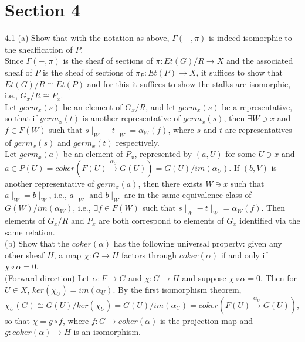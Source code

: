  \newpage
\section*{Section 4}
4.1 (a) Show that with the notation as above, $\Gamma(-, \pi)$ is indeed isomorphic to the sheaffication of $P$. \\

Since $\Gamma(-, \pi)$ is the sheaf of sections of $\pi: Et(G)/R \rightarrow X$ and the associated sheaf of $P$ is the sheaf of sections of $\pi_P:Et(P) \rightarrow X$, it suffices to show that $Et(G)/R \cong Et(P)$ and for this it suffices to show the stalks are isomorphic, i.e., $G_x/R \cong P_x$. \\

Let $\overline{germ_x(s)}$ be an element of $G_x/R$, and let $germ_x(s)$ be a representative, so that if $germ_x(t)$ is another representative of $\overline{germ_x(s)}$, then $\exists W \ni x$ and $f \in F(W)$ such that $s\mid_W - t\mid_W = \alpha_W(f)$, where $s$ and $t$ are representatives of $germ_x(s)$ and $germ_x(t)$ respectively.\\

Let $germ_x(a)$ be an element of $P_x$, represented by $(a,U)$ for some $U \ni x$ and $a \in P(U)  = coker(F(U) \xrightarrow{\alpha_U} G(U)) = G(U)/im(\alpha_U)$. If $(b,V)$ is another representative of $germ_x(a)$, then there exists $W \ni x$ such that $a\mid_W = b\mid_W$, i.e., $a\mid_W$ and $b\mid_W$ are in the same equivalence class of $G(W)/im(\alpha_W)$, i.e., $\exists f \in F(W)$ such that $s\mid_W - t\mid_W = \alpha_W(f)$. Then elements of $G_x/R$ and $P_x$ are both correspond to elements of $G_x$ identified  via the same relation.\\



(b) Show that the $coker(\alpha)$ has the following universal property: given any other sheaf $H$, a map $\chi: G \rightarrow H$ factors through $coker(\alpha)$ if and only if $\chi \circ \alpha = 0$.\\

(Forward direction) Let $\alpha:F \rightarrow G$ and $\chi:G \rightarrow H$ and suppose $\chi \circ \alpha =0$. Then for $U \in X$, $ker(\chi_U) = im(\alpha_U)$. By the first isomorphism theorem, $\chi_U(G) \cong G(U)/ker(\chi_U) = G(U)/im(\alpha_U) = coker(F(U) \xrightarrow{\alpha_U} G(U)) $, so that $\chi = g \circ f$, where $f:G \rightarrow coker(\alpha)$ is the projection map and $g:coker(\alpha) \rightarrow H$ is an isomorphism.\\

